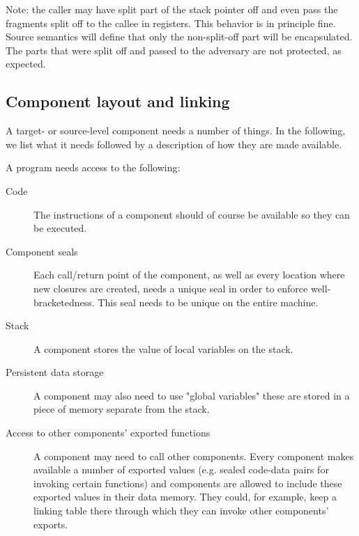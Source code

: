 \documentclass[a4paper]{article}
\begin{document}


Note: the caller may have split part of the stack pointer off and even pass the fragments split off to the callee in registers.
This behavior is in principle fine.
Source semantics will define that only the non-split-off part will be encapsulated.
The parts that were split off and passed to the adversary are not protected, as expected.

\subsection{Component layout and linking}
A target- or source-level component needs a number of things.
In the following, we list what it needs followed by a description of how they are made available.

A program needs access to the following:
\begin{description}
\item[Code] The instructions of a component should of course be available so they can be executed.
\item[Component seals] Each call/return point of the component, as well as every location where new closures are created, needs a unique seal in order to enforce well-bracketedness.
  This seal needs to be unique on the entire machine.
\item[Stack] A component stores the value of local variables on the stack. 
\item[Persistent data storage] A component may also need to use "global variables" these are stored in a piece of memory separate from the stack.
\item[Access to other components' exported functions] A component may need to call other components.
  Every component makes available a number of exported values (e.g. sealed code-data pairs for invoking certain functions) and components are allowed to include these exported values in their data memory.
  They could, for example, keep a linking table there through which they can invoke other components' exports.
\end{description}
\end{document}
